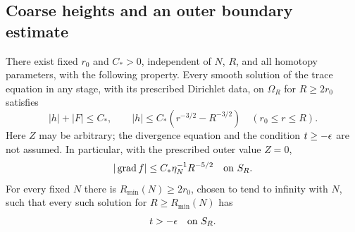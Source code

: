 \subsection{Coarse heights and an outer boundary estimate}

\begin{lemma}\label{four:lem:coarse-height}
There exist fixed $r_0$ and $C_*>0$, independent of $N$, $R$, and all
homotopy parameters, with the following property.  Every smooth solution
of the trace equation in any stage, with its prescribed Dirichlet data,
on $\Omega_R$ for $R\ge2r_0$ satisfies
\begin{equation}\label{four:sys:coarse-height}
 |h|+|F|\le C_*,\qquad
 |h|\le C_*(r^{-3/2}-R^{-3/2})\quad(r_0\le r\le R).
\end{equation}
Here $Z$ may be arbitrary; the divergence equation and the condition
$t\ge-\epsilon$ are not assumed.  In particular, with the prescribed outer
value $Z=0$,
\begin{equation}\label{four:sys:outer-gradient}
 |\operatorname{grad} f|\le C_*\eta_N^{-1}R^{-5/2}\quad\text{on }S_R.
\end{equation}
For every fixed $N$ there is $R_{\min}(N)\ge2r_0$, chosen to tend to
infinity with $N$, such that every such solution for $R\ge R_{\min}(N)$
has
\begin{equation}\label{four:sys:outer-floor}
 t> -\epsilon\quad\text{on }S_R.
\end{equation}
\end{lemma}

